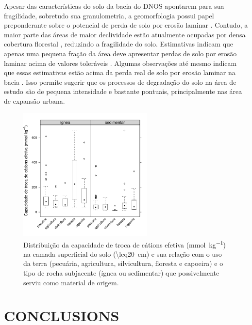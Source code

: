 Apesar das características do solo da bacia do DNOS apontarem para sua fragilidade, sobretudo sua 
granulometria, a geomorfologia possui papel preponderante sobre o potencial de perda de solo por erosão 
laminar \cite{Miguel2010}. Contudo, a maior parte das áreas de maior declividade estão atualmente ocupadas por 
densa cobertura florestal \cite{SamuelRosaEtAl2011a}, reduzindo a fragilidade do solo. Estimativas indicam que 
apenas uma pequena fração da área deve apresentar perdas de solo por erosão laminar acima de valores 
toleráveis \cite{Miguel2010}. Algumas observações até mesmo indicam que essas estimativas estão acima da perda 
real de solo por erosão laminar na bacia \cite{Branco1998, MouraBueno2012}. Isso permite sugerir que os 
processos de degradação do solo na área de estudo são de pequena intensidade e bastante pontuais, 
principalmente nas área de expansão urbana.

\begin{figure}[!ht]
\centering
\includegraphics[width=0.60\textwidth]{fig/chap03-ecec-land-parent}
\caption[Capacidade de troca de cátions efetiva no solo e sua relação com o uso da terra e o material de 
origem do solo.]{Distribuição da capacidade de troca de cátions efetiva (\si{\milli\mole\per\kilo\gram}) na 
camada superficial do solo (\SI{\leq20}{\cm}) e sua relação com o uso da terra (pecuária, agricultura, 
silvicultura, floresta e capoeira) e o tipo de rocha subjacente (ígnea ou sedimentar) que possivelmente serviu 
como material de origem.}
\label{fig:chap03-ecec-land-parent}
\end{figure}




\section{CONCLUSIONS}

